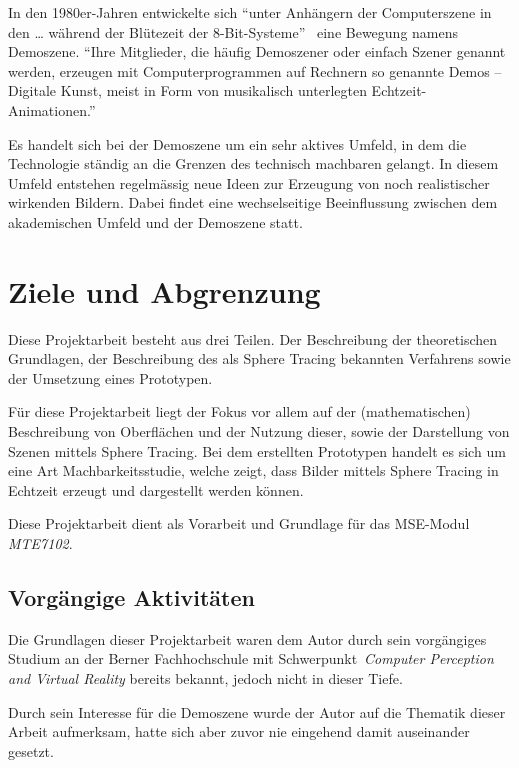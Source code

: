 In den 1980er-Jahren entwickelte sich ``unter Anhängern der
Computerszene in den \dots{} während der Blütezeit der
8-Bit-Systeme''~\cite{wikipedia_foundation_demoszene_2015} eine Bewegung
namens Demoszene. ``Ihre Mitglieder, die häufig Demoszener oder einfach
Szener genannt werden, erzeugen mit Computerprogrammen auf Rechnern so
genannte Demos – Digitale Kunst, meist in Form von musikalisch
unterlegten
Echtzeit-Animationen.''~\cite{wikipedia_foundation_demoszene_2015}

Es handelt sich bei der Demoszene um ein sehr aktives Umfeld, in dem die
Technologie ständig an die Grenzen des technisch machbaren gelangt. In
diesem Umfeld entstehen regelmässig neue Ideen zur Erzeugung von noch
realistischer wirkenden Bildern. Dabei findet eine wechselseitige
Beeinflussung zwischen dem akademischen Umfeld und der Demoszene statt.

\section{Ziele und Abgrenzung}
\label{sec:objectives}

Diese Projektarbeit besteht aus drei Teilen. Der Beschreibung der
theoretischen Grundlagen, der Beschreibung des als Sphere Tracing
bekannten Verfahrens sowie der Umsetzung eines Prototypen.

Für diese Projektarbeit liegt der Fokus vor allem auf der
(mathematischen) Beschreibung von Oberflächen und der Nutzung dieser,
sowie der Darstellung von Szenen mittels Sphere Tracing. Bei dem
erstellten Prototypen handelt es sich um eine Art Machbarkeitsstudie,
welche zeigt, dass Bilder mittels Sphere Tracing in Echtzeit erzeugt und
dargestellt werden können.

Diese Projektarbeit dient als Vorarbeit und Grundlage für das MSE-Modul
\textit{MTE7102}.

\subsection{Vorgängige Aktivitäten}
\label{subsec:preliminaries}

Die Grundlagen dieser Projektarbeit waren dem Autor durch sein
vorgängiges Studium an der Berner Fachhochschule mit
Schwerpunkt~\textit{Computer Perception and Virtual Reality} bereits
bekannt, jedoch nicht in dieser Tiefe.

Durch sein Interesse für die Demoszene wurde der Autor auf die Thematik
dieser Arbeit aufmerksam, hatte sich aber zuvor nie eingehend damit
auseinander gesetzt.

